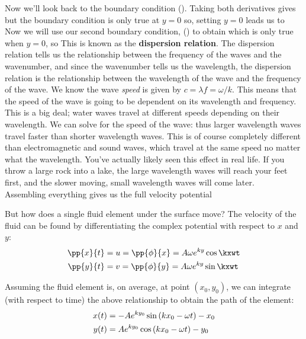 \documentclass[12pt]{book}
\begin{document}
Now we'll look back to the boundary condition ().  Taking both derivatives  gives
 but the boundary condition is only true at $y=0$ so, setting $y=0$ leads us to
Now we will use our second boundary condition, () to obtain
which is only true when $y=0$, so
This is known as the \textbf{dispersion relation}.  The dispersion relation tells us the relationship between the frequency of the waves and the wavenumber, and since the wavenumber tells us the wavelength, the dispersion relation is the relationship between the wavelength of the wave and the frequency of the wave.  We know the wave \textit{speed} is given by $c=\lambda f = \omega / k$.  This means that the speed of the wave is going to be dependent on its wavelength and frequency.  This is a big deal; water waves travel at different speeds depending on their wavelength. We can solve for the speed of the wave:
 thus larger wavelength waves travel faster than shorter wavelength waves. This is of course completely different than electromagnetic and sound waves, which travel at the same speed no matter what the wavelength.  You've actually likely seen this effect in real life.  If you throw a large rock into a lake, the large wavelength waves will reach your feet first, and the slower moving, small wavelength waves will come later.\\

Assembling everything gives us the full velocity potential

But how does a single fluid element under the surface move?  The velocity of the fluid can be found by differentiating the complex potential with respect to $x$ and $y$:
\begin{align*}
\pp{x}{t} &= u = \pp{\phi}{x} = A\omega\e{ky}\cos\kxwt \\ 
\pp{y}{t} &= v = \pp{\phi}{y} = A\omega\e{ky}\sin\kxwt
\end{align*}

Assuming the fluid element is, on average, at point $(x_0, y_0)$, we can integrate (with respect to time) the above relationship to obtain the path of the element:
\begin{align*}
x(t) & = -Ae^{ky_0}\sin\left(kx_0 - \omega t\right) - x_0 \\
y(t) & = Ae^{ky_0}\cos\left(kx_0 - \omega t\right) - y_0 \\
\end{align*}
\end{document}
